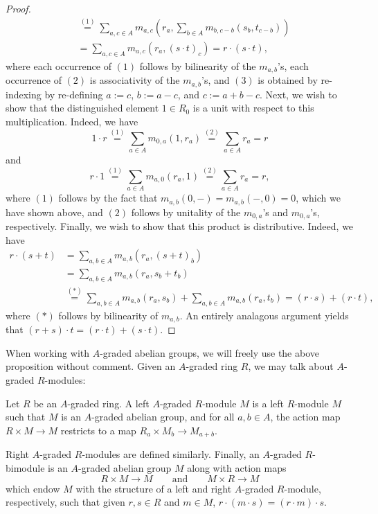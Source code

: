 \documentclass[../main.tex]{subfiles}
\begin{document}
\begin{proof}
\begin{align*}
		&\overset{(1)}=\sum_{a,c\in A}m_{a,c}\left(r_a,\sum_{b\in A}m_{b,c-b}(s_b,t_{c-b})\right) \\
		&=\sum_{a,c\in A}m_{a,c}(r_a,(s\cdot t)_c)=r\cdot(s\cdot t),
	\end{align*}
	where each occurrence of $(1)$ follows by bilinearity of the $m_{a,b}$'s, each occurrence of $(2)$ is associativity of the $m_{a,b}$'s, and $(3)$ is obtained by re-indexing by re-defining $a:=c$, $b:=a-c$, and $c:=a+b-c$. Next, we wish to show that the distinguished element $1\in R_0$ is a unit with respect to this multiplication. Indeed, we have
	\[1\cdot r\overset{(1)}=\sum_{a\in A}m_{0,a}(1,r_a)\overset{(2)}=\sum_{a\in A}r_a=r\]
	and
	\[r\cdot 1\overset{(1)}=\sum_{a\in A}m_{a,0}(r_a,1)\overset{(2)}=\sum_{a\in A}r_a=r,\]
	where $(1)$ follows by the fact that $m_{a,b}(0,-)=m_{a,b}(-,0)=0$, which we have shown above, and $(2)$ follows by unitality of the $m_{0,a}$'s and $m_{0,a}$'s, respectively. Finally, we wish to show that this product is distributive. Indeed, we have
	\begin{align*}
		r\cdot(s+t)&=\sum_{a,b\in A}m_{a,b}(r_a,(s+t)_b) \\
		&=\sum_{a,b\in A}m_{a,b}(r_a,s_b+t_b) \\
		&\overset{(*)}=\sum_{a,b\in A}m_{a,b}(r_a,s_b)+\sum_{a,b\in A}m_{a,b}(r_a,t_b)=(r\cdot s)+(r\cdot t),
	\end{align*}
	where $(*)$ follows by bilinearity of $m_{a,b}$. An entirely analagous argument yields that $(r+s)\cdot t=(r\cdot t)+(s\cdot t)$.
\end{proof}

When working with $A$-graded abelian groups, we will freely use the above proposition without comment. Given an $A$-graded ring $R$, we may talk about $A$-graded $R$-modules:

\begin{definition}
	Let $R$ be an $A$-graded ring. A left $A$-graded $R$-module $M$ is a left $R$-module $M$ such that $M$ is an $A$-graded abelian group, and for all $a,b\in A$, the action map $R\times M\to M$ restricts to a map $R_a\times M_b\to M_{a+b}$.
	
	Right $A$-graded $R$-modules are defined similarly. Finally, an $A$-graded $R$-bimodule is an $A$-graded abelian group $M$ along with action maps
	\[R\times M\to M\qquad\text{and}\qquad M\times R\to M\]
	which endow $M$ with the structure of a left and right $A$-graded $R$-module, respectively, such that given $r,s\in R$ and $m\in M$, $r\cdot(m\cdot s)=(r\cdot m)\cdot s$.
\end{definition}
\end{document}
